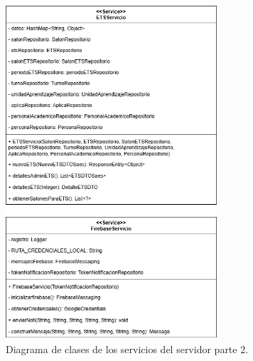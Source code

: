 \begin{figure}[htbp!]
	\begin{center}
		\includegraphics[width=0.7\textwidth]{Clases/Servicio2.png}
		\caption{Diagrama de clases de los servicios del servidor parte 2.}
		\label{fig:DS2}
	\end{center}
\end{figure}


